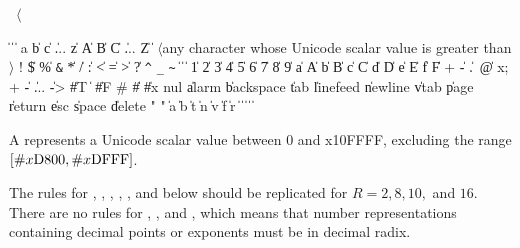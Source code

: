 \label{extendedalphas}
\label{identifiersyntax}

\hbox{\cf{} \goesto{} $\langle$}

\begin{grammar}%
 \:  
 \>  \| 
 \:  \| 
 \> \| 
 \:  a \| b \| c \| ... \| z
\> \| A \| B \| C \| ... \| Z
 \: 
 \> \| $\langle${\rm any character whose Unicode scalar value is greater than}
 \> 
 \> $\rangle$
 \: ! \| \$ \| \% \| \verb"&" \| * \| / \| : \| < \| =
 \>  \| > \| ? \| \verb"^" \| \verb"_" \| \verb"~"
 \:  \| 
 \>  \| 
 \>  \| 
  \| 1 \| 2 \| 3 \| 4 \| 5 \| 6 \| 7 \| 8 \| 9
 \: 
 \> \| a \| A \| b \| B \| c \| C \| d \| D \| e \| E \| f \| F
 \: + \| - \| .\ \| @
 \: \backwhack{}x;
 \: 
 \: + \| - \| ... \| -> 
 \: \schtrue{} \| \#T \| \schfalse{} \| \#F
 \: \#\backwhack{}
 \>  \| \#\backwhack{}
 \>  \| \#\backwhack{}x
 \: nul \| alarm \| backspace \| tab
\> \| linefeed \| newline \| vtab \| page \| return
\> \| esc \| space \| delete
 \: "  "
 \: 
 \> \| \backwhack{}a \| \backwhack{}b \| \backwhack{}t \| \backwhack{}n \| \backwhack{}v \| \backwhack{}f \| \backwhack{}r
 \>  \| \backwhack\doublequote{} \| \backwhack\backwhack 
 \>  \| \backwhack{} \| \backwhack{}
 \>  \| %
\end{grammar}

A  represents a Unicode scalar value
between 0 and \sharpsign{}x10FFFF, excluding the range
$\left[{\tt\#}{}x\textrm{D800}, {\tt\#}{}x\textrm{DFFF}\right]$.

\label{numbersyntax}%
The rules for , , , , , and  below
should be replicated for \hbox{$R = 2, 8, 10,$}
and $16$.  There are no rules for , , and , which means that number representations containing
decimal points or exponents must be in decimal radix.

